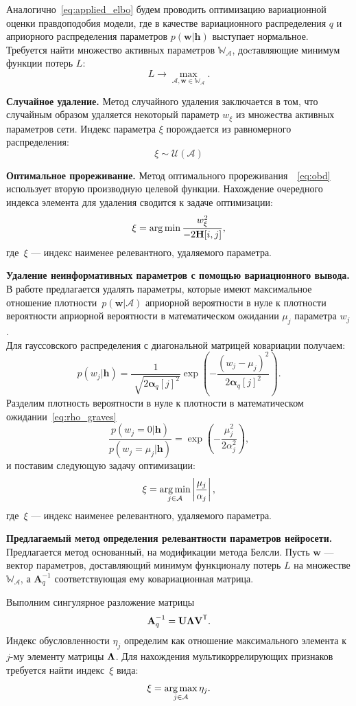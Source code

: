 Аналогично~\eqref{eq:applied_elbo} будем проводить оптимизацию вариационной оценки правдоподобия модели, где в качестве вариационного распределения $q$ и априорного распределения параметров $p(\mathbf{w}|\mathbf{h})$ выступает нормальное.
Требуется найти множество активных параметров $\mathbb{W}_{\mathcal{A}}$, доcтавляющие минимум функции потерь $L$:
$$
    L \to \max_{\mathcal{A}, \mathbf{w} \in \mathbb{W}_{\mathcal{A}}}.
$$


\textbf{Случайное удаление. }
Метод случайного удаления заключается в том, что случайным образом удаляется некоторый параметр $w_{\xi}$ из множества активных параметров сети.  Индекс параметра $\xi$ порождается из равномерного распределения:
$$\xi \sim \mathcal{U}(\mathcal{A})$$

\textbf{Оптимальное прореживание. }
Метод оптимального прореживания~\cite{obd}~\eqref{eq:obd} использует вторую производную целевой функции.
Нахождение очередного индекса элемента для удаления сводится к задаче оптимизации:
\[
    \xi = \operatorname*{arg\,min} \frac{w_{\xi}^2}{-2\mathbf{H}[i,j]},
\]
где~$\xi$ --- индекс наименее релевантного, удаляемого параметра.

\textbf{Удаление неинформативных параметров с помощью вариационного вывода. }
В работе \cite{nips} предлагается удалять параметры, которые имеют максимальное отношение плотности~$p(\textbf{w}|\mathcal{A})$ априорной вероятности в нуле к плотности вероятности априорной вероятности в математическом ожидании $\mu_j$ параметра $w_j$.\\
Для гауссовского распределения с диагональной матрицей ковариации получаем:
$$p(w_j|\mathbf{h}) = \frac{1}{\sqrt[]{2\boldsymbol{\alpha}_q[j]^2}}\exp({-\frac{(w_j-\mu_j)^2}{2\boldsymbol{\alpha}_q[j]^2}}).$$
Разделим плотность вероятности в нуле к плотности в математическом ожидании~\eqref{eq:rho_graves}
$$ \frac{p(w_j=0|\mathbf{h})}{p(w_j=\mu_j|\mathbf{h})}= \exp({-\frac{\mu_j^2}{2\alpha_j^2}}),$$
и поставим следующую задачу оптимизации:
$$\xi = \operatorname*{arg\,min}_{j\in \mathcal{A}} \left|\frac{\mu_j}{\alpha_j}\right|,$$
где~$\xi$ --- индекс наименее релевантного, удаляемого параметра.

\textbf{Предлагаемый метод определения релевантности параметров нейросети. }
Предлагается метод основанный, на модификации метода Белсли. Пусть $\mathbf{w}$ --- вектор параметров, доставляющий минимум функционалу потерь $L$ на  множестве $\mathbb{W_\mathcal{A}}$, а $\mathbf{A}^{-1}_q$ соответствующая ему ковариационная матрица.

Выполним сингулярное разложение матрицы
$$\textbf{A}^{-1}_q = \textbf{U}{\bf\Lambda}\textbf{V}^\mathsf{T}.$$
Индекс обусловленности $\eta_j$ определим как отношение максимального элемента к $j$-му элементу матрицы ${\bf\Lambda}$. Для нахождения мультикоррелирующих признаков требуется найти индекс~$\xi$ вида:
$$\xi = \operatorname*{arg\,max}_{j\in \mathcal{A}}{\eta_j}. $$

